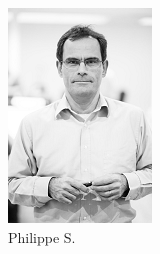 \begin{figure}[h!]
\begin{subfigure}[b]{0.2\textwidth}
                \includegraphics[width=\textwidth]{images/philippe-1-serieux.png}
                \caption{Philippe S.}
            \end{subfigure}
            \begin{subfigure}[b]{0.2\textwidth}

\end{subfigure}
\end{figure}
